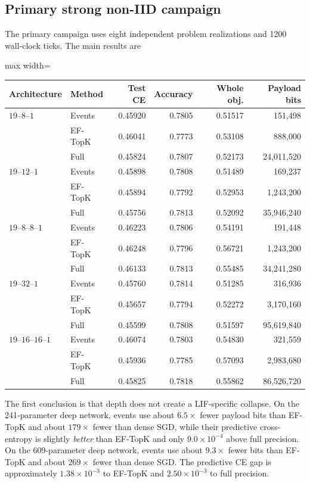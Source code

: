 \subsection{Primary strong non-IID campaign}

The primary campaign uses eight independent problem realizations and 1200 wall-clock ticks. The main results are
\begin{center}
\begin{adjustbox}{max width=\textwidth}
\begin{tabular}{llrrrr}
\toprule
Architecture & Method & Test CE & Accuracy & Whole obj. & Payload bits\\
\midrule
$19$--$8$--$1$ & Events & 0.45920 & 0.7805 & 0.51517 & 151,498\\
 & EF-TopK & 0.46041 & 0.7773 & 0.53108 & 888,000\\
 & Full & 0.45824 & 0.7807 & 0.52173 & 24,011,520\\[1mm]
$19$--$12$--$1$ & Events & 0.45898 & 0.7808 & 0.51489 & 169,237\\
 & EF-TopK & 0.45894 & 0.7792 & 0.52953 & 1,243,200\\
 & Full & 0.45756 & 0.7813 & 0.52092 & 35,946,240\\[1mm]
$19$--$8$--$8$--$1$ & Events & 0.46223 & 0.7806 & 0.54191 & 191,448\\
 & EF-TopK & 0.46248 & 0.7796 & 0.56721 & 1,243,200\\
 & Full & 0.46133 & 0.7813 & 0.55485 & 34,241,280\\[1mm]
$19$--$32$--$1$ & Events & 0.45760 & 0.7814 & 0.51285 & 316,936\\
 & EF-TopK & 0.45657 & 0.7794 & 0.52272 & 3,170,160\\
 & Full & 0.45599 & 0.7808 & 0.51597 & 95,619,840\\[1mm]
$19$--$16$--$16$--$1$ & Events & 0.46074 & 0.7803 & 0.54830 & 321,559\\
 & EF-TopK & 0.45936 & 0.7785 & 0.57093 & 2,983,680\\
 & Full & 0.45825 & 0.7818 & 0.55862 & 86,526,720\\
\bottomrule
\end{tabular}
\end{adjustbox}
\end{center}

The first conclusion is that depth does not create a LIF-specific collapse. On the 241-parameter deep network, events use about $6.5\times$ fewer payload bits than EF-TopK and about $179\times$ fewer than dense SGD, while their predictive cross-entropy is slightly \emph{better} than EF-TopK and only $9.0\times10^{-4}$ above full precision. On the 609-parameter deep network, events use about $9.3\times$ fewer bits than EF-TopK and about $269\times$ fewer than dense SGD. The predictive CE gap is approximately $1.38\times10^{-3}$ to EF-TopK and $2.50\times10^{-3}$ to full precision.

